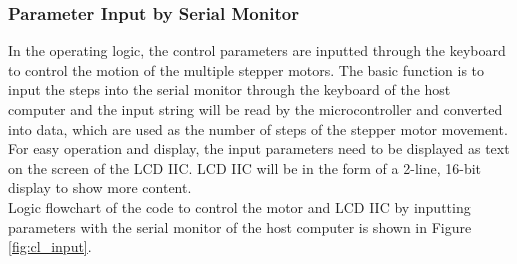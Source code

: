 \subsubsection{Parameter Input by Serial Monitor}
In the operating logic, the control parameters are inputted through the keyboard to control the motion of the 
multiple stepper motors. The basic function is to input the steps into the serial monitor through the keyboard 
of the host computer and the input string will be read by the microcontroller and converted into data, which are 
used as the number of steps of the stepper motor movement. For easy operation and display, the input parameters 
need to be displayed as text on the screen of the LCD IIC. LCD IIC will be in the form of a 2-line, 16-bit display 
to show more content. \\
Logic flowchart of the code to control the motor and LCD IIC by inputting parameters with the serial monitor of 
the host computer is shown in Figure \ref{fig:cl_input}.
